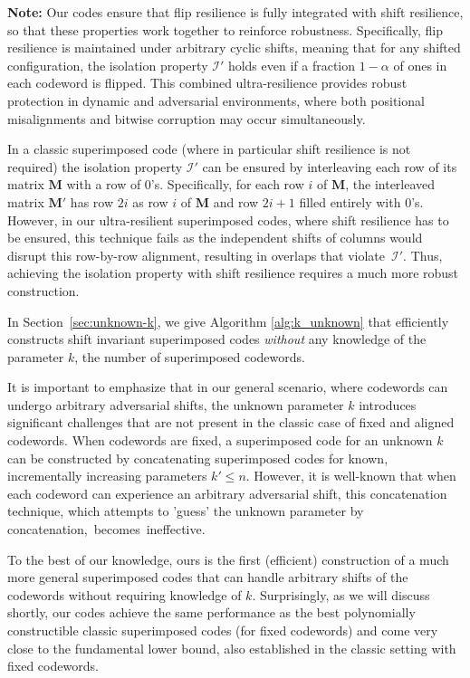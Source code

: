 \documentclass[11pt]{article}
\begin{document}
\vspace*{-1ex}
\noindent
\textbf{Note:} Our codes ensure that flip resilience is fully integrated with shift resilience, 
so that these properties work together to reinforce robustness. Specifically, flip resilience 
is maintained under arbitrary cyclic shifts, meaning that for any shifted configuration, 
the isolation property $\mathcal{I'}$ holds even if a fraction $1 - \alpha$ of ones in each codeword is 
flipped. This combined ultra-resilience provides robust protection in dynamic and adversarial environments, 
where both positional misalignments and bitwise corruption may occur simultaneously.


\vspace*{1ex}
In a classic superimposed code (where in particular shift resilience is not required)
the isolation property ${\mathcal I'}$ can be ensured by interleaving each row of its matrix 
$\mathbf{M}$ with a row of 0's. 
Specifically, for each row $i$ of $\mathbf{M}$, the interleaved matrix $\mathbf{M'}$ has
row $2i$ as row $i$ of $\mathbf{M}$ and row $2i+1$ filled entirely with 0's.
However, in our ultra-resilient superimposed codes, where shift resilience has to be ensured,
this technique fails as the independent shifts of columns would disrupt this row-by-row alignment,
resulting in overlaps that violate~${\mathcal I'}$. 
Thus, achieving the isolation property with shift resilience requires a much more robust construction.


\iffalse
In Section~\ref{sec:unknown-k}, we give Algorithm \ref{alg:k_unknown} that efficiently 
constructs shift invariant superimposed codes {\em without} any knowledge of the parameter $k$, 
the number of superimposed codewords. 

It is important to emphasize that in our general scenario, where codewords can undergo arbitrary 
adversarial shifts, the unknown parameter $k$ introduces significant challenges that are not 
present in the classic case of fixed and aligned codewords. When codewords are fixed, 
a superimposed code for an unknown $k$ can be constructed by concatenating superimposed 
codes for known, incrementally increasing parameters $k' \le n$. However, it is well-known 
that when each codeword can experience an arbitrary adversarial shift, this concatenation technique, 
which attempts to 'guess' the unknown parameter by concatenation,~becomes~ineffective.

To the best of our knowledge, ours is the first (efficient) construction of a much more general
superimposed codes that can handle arbitrary shifts of the codewords without requiring knowledge of 
$k$. Surprisingly, as we will discuss shortly, our codes achieve the same performance as the best 
polynomially constructible classic superimposed codes (for fixed codewords) and come very close 
to the fundamental lower bound, also established in the classic setting with fixed codewords.
\end{document}
